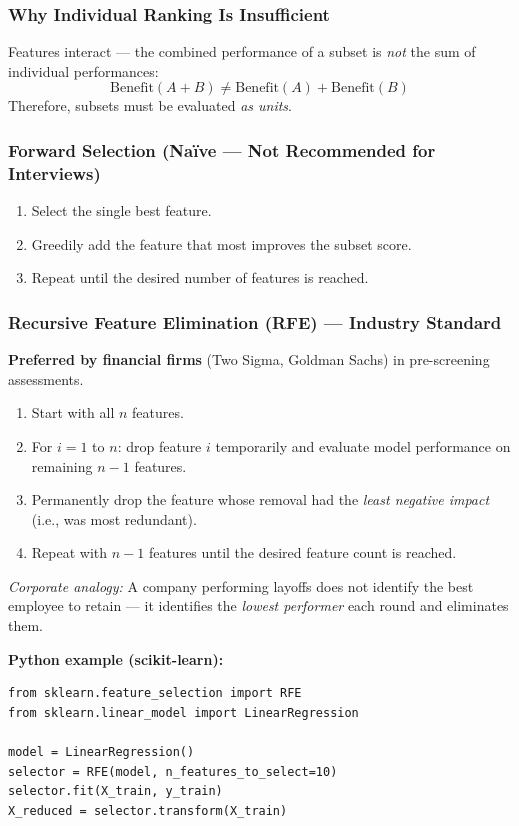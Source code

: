 \documentclass[11pt]{article}
\begin{document}
\subsubsection{Why Individual Ranking Is Insufficient}
Features interact --- the combined performance of a subset is \emph{not} the sum of individual performances:
\[
\text{Benefit}(A + B) \neq \text{Benefit}(A) + \text{Benefit}(B)
\]
Therefore, subsets must be evaluated \emph{as units}.

\subsubsection{Forward Selection (Na\"ive --- Not Recommended for Interviews)}
\begin{enumerate}
    \item Select the single best feature.
    \item Greedily add the feature that most improves the subset score.
    \item Repeat until the desired number of features is reached.
\end{enumerate}

\subsubsection{Recursive Feature Elimination (RFE) --- Industry Standard}
\textbf{Preferred by financial firms} (Two Sigma, Goldman Sachs) in pre-screening assessments.

\begin{enumerate}
    \item Start with all $n$ features.
    \item For $i = 1$ to $n$: drop feature $i$ temporarily and evaluate model performance on remaining $n-1$ features.
    \item Permanently drop the feature whose removal had the \emph{least negative impact} (i.e., was most redundant).
    \item Repeat with $n-1$ features until the desired feature count is reached.
\end{enumerate}

\textit{Corporate analogy:} A company performing layoffs does not identify the best employee to retain --- it identifies the \emph{lowest performer} each round and eliminates them.

\textbf{Python example (scikit-learn):}
\begin{verbatim}
from sklearn.feature_selection import RFE
from sklearn.linear_model import LinearRegression

model = LinearRegression()
selector = RFE(model, n_features_to_select=10)
selector.fit(X_train, y_train)
X_reduced = selector.transform(X_train)
\end{verbatim}
\end{document}
